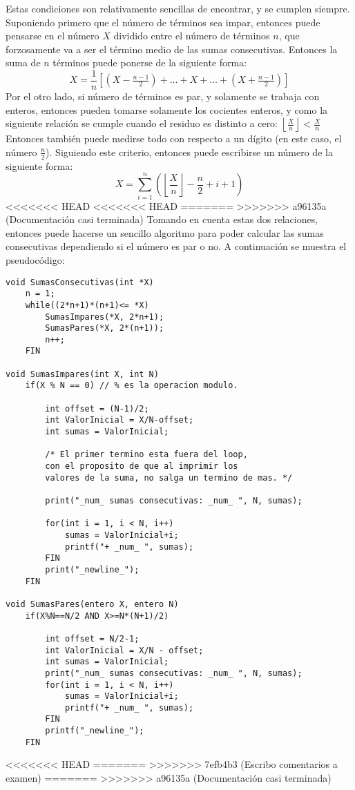 \documentclass[conference]{IEEEtran}
\begin{document}
        Estas condiciones son relativamente sencillas de encontrar, y se cumplen
        siempre. Suponiendo primero que el número de términos sea impar, entonces
        puede pensarse en el número $X$ dividido entre el número de términos $n$,
        que forzosamente va a ser el término medio de las sumas consecutivas.
        Entonces la suma de $n$ términos puede ponerse de la siguiente forma:
        \begin{equation*}
            X = \frac{1}{n}\left[(X-\tfrac{n-1}{2})+\dots+X+\dots+(X+\tfrac{n-1}{2})\right]
        \end{equation*}
        Por el otro lado, si número de términos es par, y solamente se trabaja
        con enteros, entonces pueden tomarse solamente los cocientes enteros, y
        como la siguiente relación se cumple cuando el residuo es distinto a cero: 
        $\left\lfloor\tfrac{X}{n}\right\rfloor<\tfrac{X}{n}$
        Entonces también puede medirse todo con respecto a un dígito (en este caso,
        el número $\tfrac{n}{2}$). Siguiendo este criterio, entonces puede escribirse
        un número de la siguiente forma:
        \begin{equation*}
            X = \sum_{i=1}^n\left(\left\lfloor\frac{X}{n}\right\rfloor-\frac{n}{2}+i+1\right)
        \end{equation*}
<<<<<<< HEAD
<<<<<<< HEAD
=======
>>>>>>> a96135a (Documentación casi terminada)
        Tomando en cuenta estas dos relaciones, entonces puede hacerse un sencillo
        algoritmo para poder calcular las sumas consecutivas dependiendo si el 
        número es par o no. A continuación se muestra el pseudocódigo:
        \begin{lstlisting}[style=mystyle]
void SumasConsecutivas(int *X)
    n = 1;
    while((2*n+1)*(n+1)<= *X) 
        SumasImpares(*X, 2*n+1); 
        SumasPares(*X, 2*(n+1));
        n++;
    FIN

void SumasImpares(int X, int N)
    if(X % N == 0) // % es la operacion modulo.
    
        int offset = (N-1)/2;
        int ValorInicial = X/N-offset; 
        int sumas = ValorInicial;

        /* El primer termino esta fuera del loop, 
        con el proposito de que al imprimir los 
        valores de la suma, no salga un termino de mas. */

        print("_num_ sumas consecutivas: _num_ ", N, sumas);

        for(int i = 1, i < N, i++)
            sumas = ValorInicial+i;
            printf("+ _num_ ", sumas);
        FIN
        print("_newline_");
    FIN

void SumasPares(entero X, entero N)
    if(X%N==N/2 AND X>=N*(N+1)/2)

        int offset = N/2-1;
        int ValorInicial = X/N - offset; 
        int sumas = ValorInicial;
        print("_num_ sumas consecutivas: _num_ ", N, sumas);
        for(int i = 1, i < N, i++)
            sumas = ValorInicial+i;
            printf("+ _num_ ", sumas);
        FIN
        printf("_newline_");
    FIN
        \end{lstlisting}
<<<<<<< HEAD
=======
>>>>>>> 7efb4b3 (Escribo comentarios a examen)
=======
>>>>>>> a96135a (Documentación casi terminada)
        
        
\end{document}
